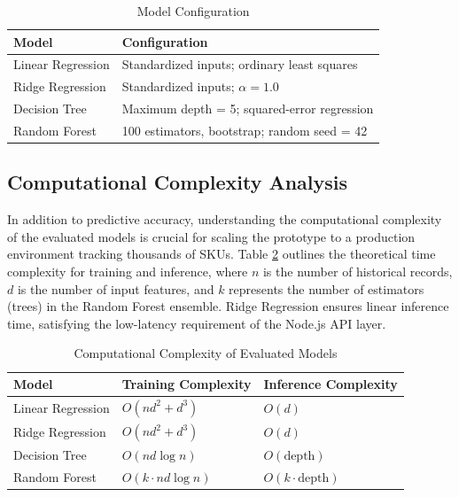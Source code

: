 \documentclass[9pt,conference]{IEEEtran}
\providecommand{\syscite}[1]{}
\begin{document}
\begin{table}[htbp]
\centering
\caption{Model Configuration}
\scriptsize
\setlength{\tabcolsep}{2.5pt}
\begin{tabular}{ll}
\toprule
\textbf{Model} & \textbf{Configuration} \\
\midrule
Linear Regression & Standardized inputs; ordinary least squares \syscite{[cite: 1]} \\
Ridge Regression & Standardized inputs; $\alpha=1.0$ \syscite{[cite: 1]} \\
Decision Tree & Maximum depth = 5; squared-error regression \syscite{[cite: 1]} \\
Random Forest & 100 estimators, bootstrap; random seed = 42 \syscite{[cite: 1]} \\
\bottomrule
\end{tabular}
\label{tab:config}
\end{table}

\subsection{Computational Complexity Analysis}
In addition to predictive accuracy, understanding the computational complexity of the evaluated models is crucial for scaling the prototype to a production environment tracking thousands of SKUs. Table \ref{tab:complexity} outlines the theoretical time complexity for training and inference, where $n$ is the number of historical records, $d$ is the number of input features, and $k$ represents the number of estimators (trees) in the Random Forest ensemble. Ridge Regression ensures linear inference time, satisfying the low-latency requirement of the Node.js API layer.

\begin{table}[htbp]
\centering
\caption{Computational Complexity of Evaluated Models}
\scriptsize
\setlength{\tabcolsep}{2.5pt}
\begin{tabular}{lll}
\toprule
\textbf{Model} & \textbf{Training Complexity} & \textbf{Inference Complexity} \\
\midrule
Linear Regression & $O(nd^2 + d^3)$ & $O(d)$ \\
Ridge Regression & $O(nd^2 + d^3)$ & $O(d)$ \\
Decision Tree & $O(nd \log n)$ & $O(\text{depth})$ \\
Random Forest & $O(k \cdot nd \log n)$ & $O(k \cdot \text{depth})$ \\
\bottomrule
\end{tabular}
\label{tab:complexity}
\end{table}
\end{document}
